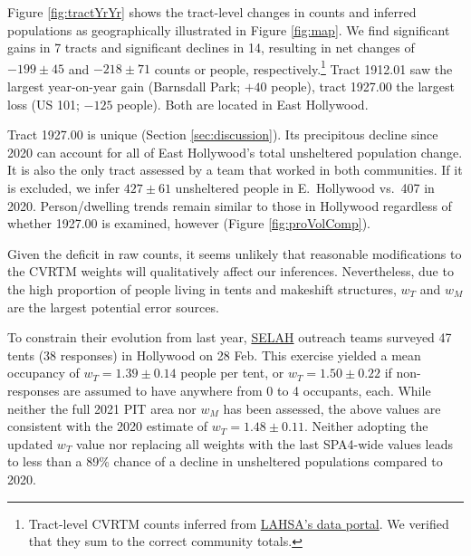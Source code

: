 \documentclass[11pt,twocolumn]{article}
\def\resp{respectively}
\begin{document}
Figure \ref{fig:tractYrYr} shows the tract-level changes in counts and inferred populations as
geographically illustrated in Figure \ref{fig:map}. We find significant gains in 7 tracts and significant 
declines in 14, resulting in net changes of $-199\pm45$ and $-218\pm71$ counts or people, \resp.\footnote{Tract-level 
CVRTM counts inferred from \href{https://www.lahsa.org/data?id=45-2020-homeless-count-by-community-city}
{LAHSA's data portal}. We verified that they sum to the correct community totals.} 
Tract 1912.01 saw the largest year-on-year gain (Barnsdall Park; $+40$ people), tract 
1927.00 the largest loss (US 101; $-125$ people). Both are located in East Hollywood.

Tract 1927.00 is unique (Section \ref{sec:discussion}). Its precipitous decline since 2020 can account for all 
of East Hollywood's total unsheltered population change. It is also the only 
tract assessed by a team that worked in both communities. If it is excluded, we infer $427\pm61$ unsheltered 
people in E.~Hollywood vs.\ 407 in 2020. Person/dwelling trends remain similar to those in 
Hollywood regardless of whether 1927.00 is examined, however (Figure \ref{fig:proVolComp}).

Given the deficit in raw counts, it seems unlikely that reasonable modifications to the CVRTM weights 
will qualitatively affect our inferences. Nevertheless, due to the high proportion of people living in tents and 
makeshift structures, $w_{T}$ and $w_{M}$ are the largest potential error sources. 

To constrain their evolution
from last year, \href{https://selahnhc.org}{SELAH} outreach teams surveyed 47 tents (38 responses) 
in Hollywood on 28 Feb. This exercise yielded a mean occupancy of $w_{T}=1.39\pm0.14$ people per tent, 
or $w_{T}=1.50\pm0.22$ if non-responses are assumed to have anywhere from 0 to 4 occupants, each. 
While neither the full 2021 PIT area nor $w_{M}$ has been assessed,
the above values are consistent with the 2020 estimate of $w_{T}=1.48\pm0.11$. Neither adopting the 
updated $w_{T}$ value nor replacing all weights with the last SPA4-wide values leads to less than a
89\% chance of a decline in unsheltered populations compared to 2020. %
\end{document}
